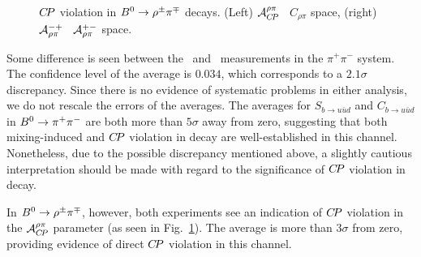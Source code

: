 \begin{figure}[htb]
\begin{center}
{    }
  \end{center}
  \vspace{-0.8cm}
  \caption{
    $C\!P$ violation in $B^0\to\rho^\pm\pi^\mp$ decays.
    (Left) ${\cal A}^{\rho\pi}_{C\!P}$ \vs\ $C_{\rho\pi}$ space,
    (right) ${\cal A}^{-+}_{\rho\pi}$ \vs\ ${\cal A}^{+-}_{\rho\pi}$ space.
  }
  \label{fig:cp_uta:uud:rhopi-dircp}
\end{figure}

Some difference is seen between the 
\babar\ and \belle\ measurements in the $\pi^+\pi^-$ system.
The confidence level of the average is $0.034$,
which corresponds to a $2.1\sigma$ discrepancy.  Since there is no
evidence of systematic problems in either analysis,
we do not rescale the errors of the averages.
The averages for $S_{b \to u\bar u d}$ and $C_{b \to u\bar u d}$ 
in $B^0 \to \pi^+\pi^-$ are both more than $5\sigma$ away from zero,
suggesting that both mixing-induced and $C\!P$ violation in decay
are well-established in this channel.
Nonetheless, due to the possible discrepancy mentioned above,
a slightly cautious interpretation should be made 
with regard to the significance of $C\!P$ violation in decay.

In $B^0 \to \rho^\pm\pi^\mp$, however,
both experiments see an indication of $C\!P$ violation in the 
${\cal A}^{\rho\pi}_{C\!P}$ parameter 
(as seen in Fig.~\ref{fig:cp_uta:uud:rhopi-dircp}).
The average is more than $3\sigma$ from zero,
providing evidence of direct $C\!P$ violation in this channel.

\label{sec:cp_uta:cus:alpha}

